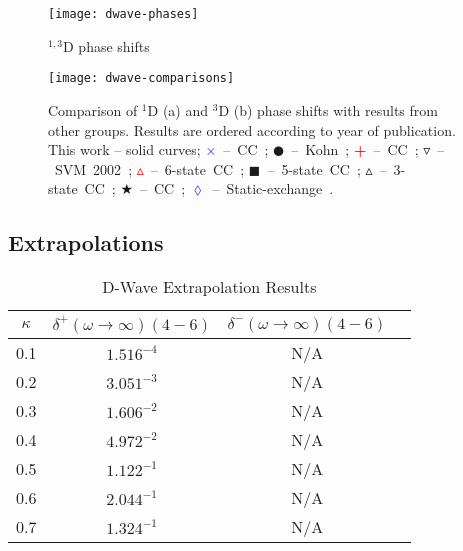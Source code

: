 \documentclass[Dissertation.tex]{subfiles}
\begin{document}
\begin{figure}[H]
	\centering
	\texttt{[image: dwave-phases]}
	\caption{$^{1,3}$D phase shifts}
	\label{fig:DWavePhase}
\end{figure}


\begin{figure}[H]
	\centering
	\texttt{[image: dwave-comparisons]}
	\caption[Comparison of D-wave phase shifts]{Comparison of $^1$D (a) and $^3$D (b) phase shifts with results from other groups. Results are ordered according to year of publication. This work -- solid curves; \mbox{\textcolor{blue}{$\times$} -- CC \cite{Walters2004};} \mbox{$\CIRCLE$ -- Kohn \cite{VanReeth2003};} \mbox{\textcolor{red}{\textbf{+}} -- CC \cite{Blackwood2002};} \mbox{$\triangledown$ -- SVM 2002 \cite{Ivanov2002};} \mbox{\textcolor{red}{$\vartriangle$} -- 6-state CC \cite{Sinha2000};} \mbox{$\blacksquare$ -- 5-state CC \cite{Adhikari1999};} \mbox{$\vartriangle$ -- 3-state CC \cite{Sinha1997};} \mbox{\textcolor[RGB]{0,127,0}{$\bigstar$} -- CC \cite{Ray1997};} \mbox{\textcolor{blue}{$\lozenge$} -- Static-exchange \cite{Hara1975}.}}
	\label{fig:DWaveComparisons}
\end{figure}


\subsection{Extrapolations}


\begin{table}[H]
\begin{center}
\begin{tabular}{c | c c c}
\toprule
$\kappa$ & $\delta^+ (\omega \rightarrow \infty) (4-6)$ & $\delta^- (\omega \rightarrow \infty) (4-6)$  \\
\midrule
0.1 & $1.516^{-4}$ & N/A \\
0.2 & $3.051^{-3}$ & N/A \\
0.3 & $1.606^{-2}$ & N/A \\
0.4 & $4.972^{-2}$ & N/A \\
0.5 & $1.122^{-1}$ & N/A \\
0.6 & $2.044^{-1}$ & N/A \\
0.7 & $1.324^{-1}$ & N/A \\
\bottomrule
\end{tabular}
\caption{D-Wave Extrapolation Results}
\label{tab:DWaveExtrap}
\end{center}
\end{table}
\end{document}

